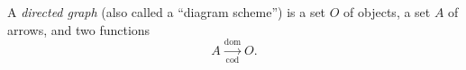 A \emph{directed graph} (also called a ``diagram scheme'') is a set $O$ of objects, a set $A$ of arrows, and two functions
$$A \xrightarrow[\text{cod}]{\text{dom}} O.$$
